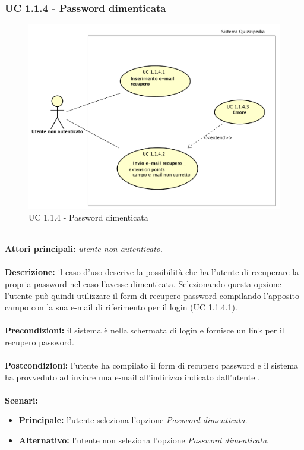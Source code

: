 \documentclass[a4paper,11pt]{article}
\begin{document}
\subsubsection{UC 1.1.4 - Password dimenticata}
\begin{figure}[h!]
\centering
\includegraphics[scale=0.5]{../immagini/UC1_1_4.png}
\caption{UC 1.1.4 - Password dimenticata}
\end{figure}
\ \\
\textbf{Attori principali:} \textit{utente non autenticato}.\\
\\
\textbf{Descrizione:} il caso d'uso descrive la possibilità che ha l'utente di recuperare la propria password nel caso l'avesse dimenticata. Selezionando questa opzione l'utente può quindi utilizzare il form di recupero password compilando l'apposito campo con la sua e-mail di riferimento per il login (UC 1.1.4.1). \\
\\
\textbf{Precondizioni:} il sistema è nella schermata di login e fornisce un link per il recupero password.\\
\\
\textbf{Postcondizioni:} l'utente ha compilato il form di recupero password e il sistema ha provveduto ad inviare una e-mail all'indirizzo indicato dall'utente . \\
\\
\textbf{Scenari:}
\begin{itemize}
\item \textbf{Principale:} l'utente seleziona l'opzione \textit{Password dimenticata}.
\item \textbf{Alternativo:} l'utente non seleziona l'opzione \textit{Password dimenticata}.
\end{itemize}
\end{document}
